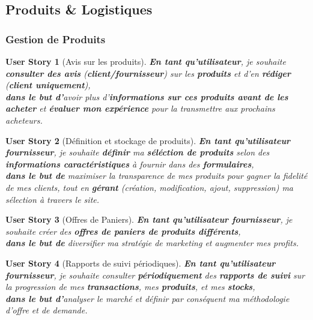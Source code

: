 \documentclass[a4paper,12pt]{book}
\theoremstyle{break}
\newtheorem*{userStory}{User Story}
\theoremstyle{break}
\theoremstyle{break}
\theoremstyle{break}
\theoremstyle{definition}
\theoremstyle{remark}
\begin{document}
\subsection{Produits \& Logistiques}
\subsubsection{Gestion de Produits}
\begin{userStory}[Avis sur les produits]
\textbf{En tant qu'utilisateur}, je souhaite \textbf{consulter des avis} (\textbf{{\color{green}client}/{\color{red}fournisseur}}) sur les \textbf{produits} et d'en \textbf{rédiger} (\textbf{{\color{green}client} uniquement}),\\
\indent
\textbf{dans le but d'}avoir plus d'\textbf{informations sur ces produits avant de les acheter} et \textbf{évaluer mon expérience} pour la transmettre aux prochains acheteurs.
\end{userStory}

\begin{userStory}[Définition et stockage de produits]
\textbf{En tant qu'utilisateur {\color{red}fournisseur}}, je souhaite \textbf{définir} ma \textbf{séléction de produits} selon des \textbf{informations caractéristiques} à fournir dans des \textbf{formulaires},\\
\indent
\textbf{dans le but de} maximiser la transparence de mes produits pour gagner la fidelité de mes clients, tout en \textbf{gérant} (création, modification, ajout, suppression) ma sélection à travers le site.
\end{userStory}

\begin{userStory}[Offres de Paniers]
\textbf{En tant qu'utilisateur {\color{red}fournisseur}}, je souhaite créer des \textbf{offres de paniers de produits différents},\\
\indent
\textbf{dans le but de} diversifier ma stratégie de marketing et augmenter mes profits.
\end{userStory}

\begin{userStory}[Rapports de suivi périodiques]
\textbf{En tant qu'utilisateur {\color{red}fournisseur}}, je souhaite consulter \textbf{périodiquement} des \textbf{rapports de suivi} sur la progression de mes \textbf{transactions}, mes \textbf{produits}, et mes \textbf{stocks},\\
\indent
\textbf{dans le but d'}analyser le marché et définir par conséquent ma méthodologie d'offre et de demande.
\end{userStory}
\end{document}
